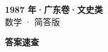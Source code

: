 \documentclass[zihao=-4, a4paper]{ctexart}
\begin{document}
\begin{center}
  {\Large\bfseries 1987 年·广东卷·文史类}\\[4pt]
  {\large 数学 · 简答版}
\end{center}
\medskip
{}

\clearpage
{}
\begin{center}{\Large\bfseries 答案速查}\end{center}
\medskip

\end{document}
